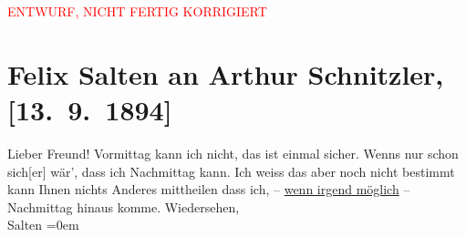 
\begin{center}
            \textcolor{red}{ENTWURF, NICHT FERTIG KORRIGIERT}
                      \end{center}
            
         \renewcommand{\erwaehnteOrte}{Orte: Wien}
         \renewcommand{\erwaehnteWerke}{}
               \section[Felix Salten an Arthur Schnitzler, {[}13. 9. 1894{]}]{ Felix Salten an Arthur Schnitzler, {[}13. 9. 1894{]}}\nopagebreak{}\rehead{ }\begin{ledgroupsized}[t]{13cm}\normalsize\beginnumbering \toendnotes[C]{\smallbreak\pagebreak[2]} 
\pstart{}{\pb}Lieber Freund!\pend\pstart
           Vormittag kann ich nicht, das ist einmal sicher. Wenns nur schon
                  sich{[}er{]} wär’, dass ich Nachmittag kann. Ich weiss das aber
               noch nicht bestimmt {\kaufmannsund} kann Ihnen nichts {\pb}Anderes mittheilen dass ich, – \uline{wenn irgend möglich} – Nachmittag hinaus komme. \pend
           \pstart
           Wiedersehen, {\\[\baselineskip]}\spacefill\mbox{Salten}\pend
           \leftskip=0em{}
         
         \endnumbering{}\end{ledgroupsized}\begin{anhang}\end{anhang}\newcommand{\dateiname}{L03146}\newcommand{\titel}{Felix Salten an Arthur Schnitzler, [13. 9. 1894]}\newcommand{\editorInnen}{Martin Anton Müller und Laura Untner}
      